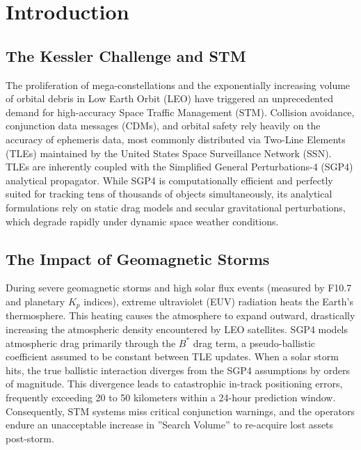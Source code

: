 \section{Introduction}

\subsection{The Kessler Challenge and STM}
The proliferation of mega-constellations and the exponentially increasing volume of orbital debris in Low Earth Orbit (LEO) have triggered an unprecedented demand for high-accuracy Space Traffic Management (STM). Collision avoidance, conjunction data messages (CDMs), and orbital safety rely heavily on the accuracy of ephemeris data, most commonly distributed via Two-Line Elements (TLEs) maintained by the United States Space Surveillance Network (SSN). TLEs are inherently coupled with the Simplified General Perturbations-4 (SGP4) analytical propagator. While SGP4 is computationally efficient and perfectly suited for tracking tens of thousands of objects simultaneously, its analytical formulations rely on static drag models and secular gravitational perturbations, which degrade rapidly under dynamic space weather conditions.

\subsection{The Impact of Geomagnetic Storms}
During severe geomagnetic storms and high solar flux events (measured by F10.7 and planetary $K_p$ indices), extreme ultraviolet (EUV) radiation heats the Earth's thermosphere. This heating causes the atmosphere to expand outward, drastically increasing the atmospheric density encountered by LEO satellites. SGP4 models atmospheric drag primarily through the $B^*$ drag term, a pseudo-ballistic coefficient assumed to be constant between TLE updates. When a solar storm hits, the true ballistic interaction diverges from the SGP4 assumptions by orders of magnitude. This divergence leads to catastrophic in-track positioning errors, frequently exceeding 20 to 50 kilometers within a 24-hour prediction window. Consequently, STM systems miss critical conjunction warnings, and the operators endure an unacceptable increase in ''Search Volume'' to re-acquire lost assets post-storm.

